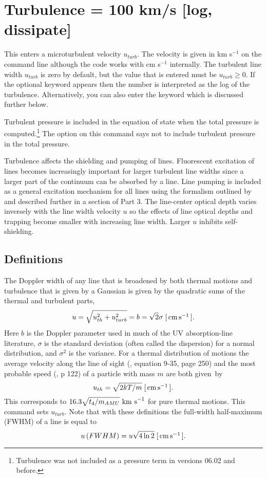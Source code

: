 \section{Turbulence = 100 km/s [log, dissipate]}

This enters a microturbulent velocity $u_{turb}$.
The velocity is given in
km s$^{-1}$ on the command line although the code works with
cm s$^{-1}$ internally. The turbulent line width $u_{turb}$ is zero by default,
but the value that is entered must be $u_{turb} \ge 0$.
If the optional keyword  appears then the number
is interpreted as the log of the turbulence. Alternatively, you can
also enter the keyword  which is discussed
further below.

Turbulent pressure is included in the equation of state when the total
pressure is computed.\footnote{Turbulence was not included as a pressure term in versions 06.02
and before.}
The 
option on this command says not to include turbulent pressure in the total
pressure.

Turbulence affects the shielding and pumping of lines.
Fluorescent
excitation of lines becomes increasingly important for larger turbulent
line widths since a larger part of the continuum can be absorbed by a line.
Line pumping is included as a general excitation mechanism for all lines
using the formalism outlined by \citet{Ferland1992} and described further in
a section of Part 3.
The line-center optical depth varies inversely with
the line width velocity $u$ so the effects of line optical depths
and trapping become smaller with increasing line width.
Larger $u$ inhibits self-shielding.

\subsection{Definitions }

The Doppler width of any line that is broadened by both thermal motions
and turbulence that is given by a Gaussian is given by the quadratic sums
of the thermal and turbulent parts,
\begin{equation}
u = \sqrt {u_{th}^2  + u_{turb}^2 }  = b = \sqrt 2 \sigma\;
 [\mbox{${\rm\thinspace cm}{\rm\thinspace s}^{-1}\,$} ].
\end{equation}
Here $b$ is the Doppler parameter used in much of the UV absorption-line
literature, $\sigma $ is the standard deviation
(often called the dispersion) for
a normal distribution, and $\sigma^2$ is the variance.
For a thermal distribution
of motions the average velocity along the line of sight
(\citealp{Mihalas1978}, equation 9-35, page 250)
and the most probable speed (\citealp{Novotny1973}, p 122)
of a particle with mass $m$ are both given~by
\begin{equation}
u_{th}  = \sqrt {2kT/m}\;
[\mbox{${\rm\thinspace cm}{\rm\thinspace s}^{-1}\,$} ].
\end{equation}
This corresponds to $16.3 \sqrt{ t_4/m_{AMU}}\ {\rm km\ s}^{-1}$ for pure thermal motions.
This command sets $u_{turb}$.
Note that with these definitions the full-width half-maximum
(FWHM) of a line is equal to
\begin{equation}
u\left( {FWHM} \right) = u\sqrt {4\ln 2}\;
[\mbox{${\rm\thinspace cm}{\rm\thinspace s}^{-1}\,$} ].
\end{equation}

